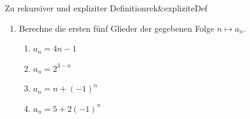 \pagebreak
\begin{ueb}{Zu rekursiver und expliziter Definition}{rek&expliziteDef}
    \begin{enumerate}
        \item Berechne die ersten fünf Glieder der gegebenen Folge $n \mapsto a_n$.
        \begin{enumerate}
            \item $a_n = 4n - 1$
            \item $a_n = 2^{3-n}$
            \item $a_n = n + (-1)^n$
            \item $a_n = 5 + 2(-1)^n$
        \end{enumerate}
    
    

\end{enumerate}
\end{ueb}
